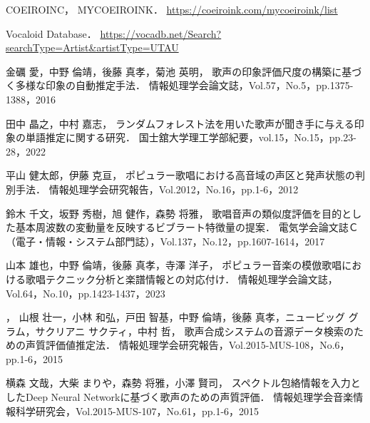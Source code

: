 \thispagestyle{myheadings}

\begin{thebibliography}{参考文献}

COEIROINC，
MYCOEIROINK．
\url{https://coeiroink.com/mycoeiroink/list}

Vocaloid Database．
\url{https://vocadb.net/Search?searchType=Artist&artistType=UTAU}




金礪 愛，中野 倫靖，後藤 真孝，菊池 英明，
歌声の印象評価尺度の構築に基づく多様な印象の自動推定手法．
情報処理学会論文誌，Vol.57，No.5，pp.1375-1388，2016

田中 晶之，中村 嘉志，
ランダムフォレスト法を用いた歌声が聞き手に与える印象の単語推定に関する研究．
国士舘大学理工学部紀要，vol.15，No.15，pp.23-28，2022

平山 健太郎，伊藤 克亘，
ポピュラー歌唱における高音域の声区と発声状態の判別手法．
情報処理学会研究報告，Vol.2012，No.16，pp.1-6，2012

鈴木 千文，坂野 秀樹，旭 健作，森勢 将雅，
歌唱音声の類似度評価を目的とした基本周波数の変動量を反映するビブラート特徴量の提案．
電気学会論文誌Ｃ（電子・情報・システム部門誌），Vol.137，No.12，pp.1607-1614，2017

山本 雄也，中野 倫靖，後藤 真孝，寺澤 洋子，
ポピュラー音楽の模倣歌唱における歌唱テクニック分析と楽譜情報との対応付け．
情報処理学会論文誌，Vol.64，No.10，pp.1423-1437，2023

，
山根 壮一，小林 和弘，戸田 智基，中野 倫靖，後藤 真孝，ニュービッグ グラム，サクリアニ サクティ，中村 哲，
歌声合成システムの音源データ検索のための声質評価値推定法．
情報処理学会研究報告，Vol.2015-MUS-108，No.6，pp.1-6，2015

横森 文哉，大柴 まりや，森勢 将雅，小澤 賢司，
スペクトル包絡情報を入力としたDeep Neural Networkに基づく歌声のための声質評価．
情報処理学会音楽情報科学研究会，Vol.2015-MUS-107，No.61，pp.1-6，2015


\end{thebibliography}
